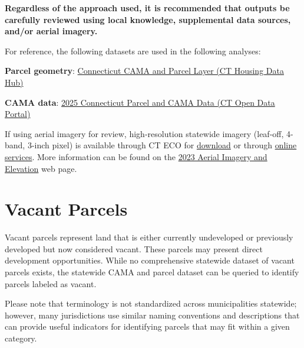 \documentclass[
  letterpaper,
  DIV=11,
  numbers=noendperiod]{scrreprt}
\begin{document}
\textbf{Regardless of the approach used, it is recommended that outputs
be carefully reviewed using local knowledge, supplemental data sources,
and/or aerial imagery.}

For reference, the following datasets are used in the following
analyses:

\textbf{Parcel geometry}:
\href{https://housingmaps.ct.gov/datasets/ctmaps::connecticut-cama-and-parcel-layer/about}{Connecticut
CAMA and Parcel Layer (CT Housing Data Hub)}

\textbf{CAMA data}:
\href{https://data.ct.gov/Local-Government/2025-Connecticut-Parcel-and-CAMA-Data/rny9-6ak2/about_data}{2025
Connecticut Parcel and CAMA Data (CT Open Data Portal)}

\begin{tcolorbox}[enhanced jigsaw, arc=.35mm, bottomrule=.15mm, breakable, colback=white, colframe=quarto-callout-note-color-frame, left=2mm, leftrule=.75mm, opacityback=0, rightrule=.15mm, toprule=.15mm]

If using aerial imagery for review, high‑resolution statewide imagery
(leaf-off, 4-band, 3-inch pixel) is available through CT ECO for
\href{https://maps.cteco.uconn.edu/download/}{download} or through
\href{https://maps.cteco.uconn.edu/map-services/}{online services}. More
information can be found on the
\href{https://maps.cteco.uconn.edu/data/flight2023/}{2023 Aerial Imagery
and Elevation} web page.

\end{tcolorbox}

\section{Vacant Parcels}\label{vacant-parcels}

Vacant parcels represent land that is either currently undeveloped or
previously developed but now considered vacant. These parcels may
present direct development opportunities. While no comprehensive
statewide dataset of vacant parcels exists, the statewide CAMA and
parcel dataset can be queried to identify parcels labeled as vacant.

\begin{tcolorbox}[enhanced jigsaw, arc=.35mm, bottomrule=.15mm, breakable, colback=white, colframe=quarto-callout-warning-color-frame, left=2mm, leftrule=.75mm, opacityback=0, rightrule=.15mm, toprule=.15mm]

Please note that terminology is not standardized across municipalities
statewide; however, many jurisdictions use similar naming conventions
and descriptions that can provide useful indicators for identifying
parcels that may fit within a given category.

\end{tcolorbox}
\end{document}
